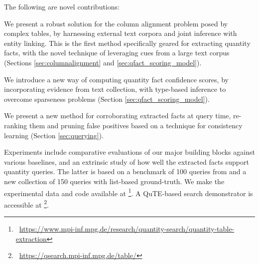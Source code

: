 \vspace{0.1cm}
%
%
The following are novel contributions:
\squishlist
\item We present 
a robust solution for the 
column alignment problem posed by complex tables,
by harnessing external text corpora
and joint inference with entity linking.
This is the first method specifically geared for
extracting quantity facts, with the novel technique of
leveraging cues from a large text corpus (Sections \ref{sec:columnalignment}
and \ref{sec:qfact_scoring_model}).
\item We introduce a new way of computing quantity fact confidence scores, by incorporating evidence from text collection, with type-based inference to overcome sparseness problems (Section \ref{sec:qfact_scoring_model}).
\item We present a new method for corroborating
extracted facts at query time, re-ranking them and pruning false positives
based on a technique for consistency learning (Section \ref{sec:querying}).
\item Experiments include comparative evaluations of
our major building blocks against 
various
baselines, and an extrinsic study of how well
the extracted facts support quantity queries.
The latter is based on a benchmark of 100 queries
from \cite{DBLP:conf/semweb/HoIPBW19} and a new
collection of 150 queries with list-based ground-truth.
\squishend
We make the experimental data and code available at 
\footnote{
~\url{https://www.mpi-inf.mpg.de/research/quantity-search/quantity-table-extraction}
}.
A QuTE-based search demonstrator is accessible at
\footnote{
~\url{https://qsearch.mpi-inf.mpg.de/table/}
}.


